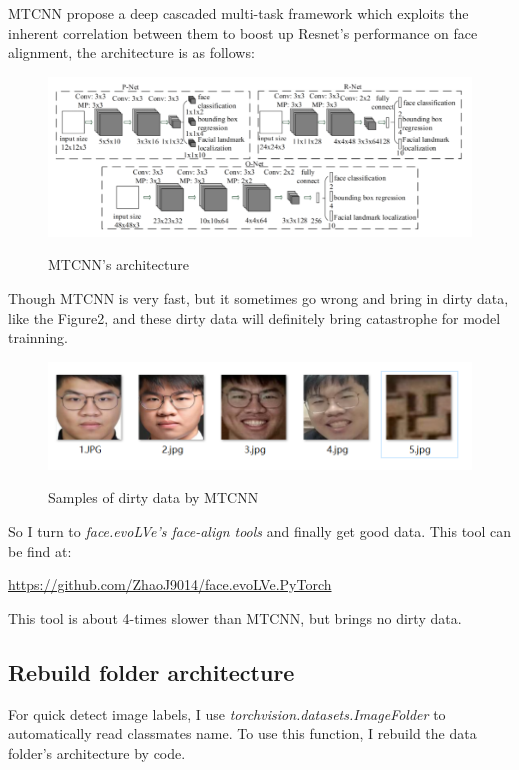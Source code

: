 \documentclass{article}
\begin{document}
MTCNN propose a deep cascaded multi-task framework which
exploits the inherent correlation between them to boost up Resnet's performance on face alignment, the architecture is as follows:
\begin{figure}[H]%
  \centering
  \caption{MTCNN's architecture}
  \includegraphics[width=\columnwidth]{IMG/MTCNN.png} %
  \label{Fig.RNN} %
\end{figure}
Though MTCNN is very fast, but it sometimes go wrong and bring in dirty data, like the Figure2, and these dirty data will definitely bring catastrophe for model trainning.
\begin{figure}[H]%
  \centering
  \caption{Samples of dirty data by MTCNN}
  \includegraphics[width=\columnwidth]{IMG/ML大作业筛选展示.png} %
  \label{Fig.RNN} %
\end{figure}
So I turn to \textit{face.evoLVe's face-align tools} and finally get good data.
This tool can be find at:
\begin{center}
  \url{https://github.com/ZhaoJ9014/face.evoLVe.PyTorch}
\end{center}
This tool is about 4-times slower than MTCNN, but brings no dirty data.
\subsection{Rebuild folder architecture}
For quick detect image labels, I use \textit{torchvision.datasets.ImageFolder} to automatically read classmates name. To use this function, I rebuild the data folder's architecture by code.
\end{document}
